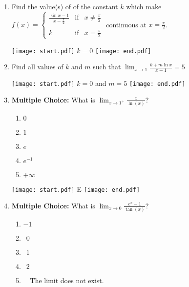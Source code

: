 \documentclass[12pt]{article}
\begin{document}
\begin{enumerate}
\item Find the value(s) of of the constant $k$ which make $f(x)=\left\{\begin{array}{lll}
\frac{\sin{x}-1}{x-\frac{\pi}{2}} & \text{if} & x \neq \frac{\pi}{2}\\
&&\\
k & \text{if} & x=\frac{\pi}{2}
\end{array}\right.$ continuous at $x=\frac{\pi}{2}$.

\texttt{[image: start.pdf]}
{{$k=0$}}
\texttt{[image: end.pdf]}


\item Find all values of $k$ and $m$ such that $\lim_{x \rightarrow 1}{\frac{k+m\ln{x}}{x-1}}=5$

\texttt{[image: start.pdf]}
{{$k=0$ and $m=5$}}
\texttt{[image: end.pdf]}


\item {\bf Multiple Choice:} What is $\displaystyle \lim_{x\rightarrow 1^+} \frac{x}{\ln(x)}$?

\begin{enumerate}

\item $0$

\item $1$

\item $e$

\item $e^{-1}$

\item $+\infty$

\end{enumerate}

\texttt{[image: start.pdf]}
{{E}}
\texttt{[image: end.pdf]}


\item {\bf Multiple Choice:} What is $\displaystyle \lim_{x\rightarrow 0}\frac{e^x-1}{\tan(x)}$?

\begin{enumerate}

\item $-1$

\item $\ \ 0$

\item $\ \ 1$

\item $\ \ 2$

\item \ \ The limit does not exist.


\end{enumerate}
\end{enumerate}
\end{document}
